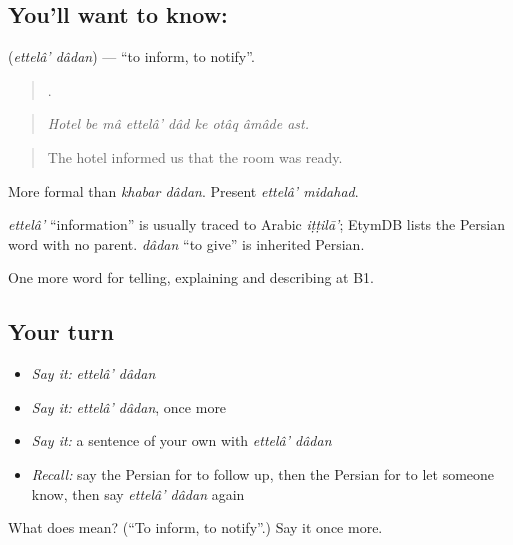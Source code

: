 \subsection*{You'll want to know:  }
\textbf{ } (\emph{ettelâ' dâdan}) — \textquotedblleft{}to inform, to notify\textquotedblright{}.

\begin{quote}
        .
\end{quote}

\begin{quote}
\emph{Hotel be mâ ettelâ' dâd ke otâq âmâde ast.}
\end{quote}

\begin{quote}
The hotel informed us that the room was ready.
\end{quote}

More formal than \emph{khabar dâdan}. Present \emph{ettelâ' midahad}.

\begin{cousinweb}
\emph{ettelâ'} \textquotedblleft{}information\textquotedblright{} is usually traced to Arabic \emph{iṭṭilā'}; EtymDB lists the Persian word with no parent. \emph{dâdan} \textquotedblleft{}to give\textquotedblright{} is inherited Persian.
\end{cousinweb}

\begin{grammarlens}[title={What you've built}]
One more word for telling, explaining and describing at B1.
\end{grammarlens}

\subsection*{Your turn}
\begin{itemize}
\raggedright
  \item \emph{Say it:} \emph{ettelâ' dâdan}
  \item \emph{Say it:} \emph{ettelâ' dâdan}, once more
  \item \emph{Say it:} a sentence of your own with \emph{ettelâ' dâdan}
  \item \emph{Recall:} say the Persian for to follow up, then the Persian for to let someone know, then say \emph{ettelâ' dâdan} again
\end{itemize}

\begin{tcolorbox}[breakable,colback=teal!4,colframe=teal!35!black,title={Before you move on}]
What does   mean? (\textquotedblleft{}To inform, to notify\textquotedblright{}.) Say it once more.
\end{tcolorbox}
